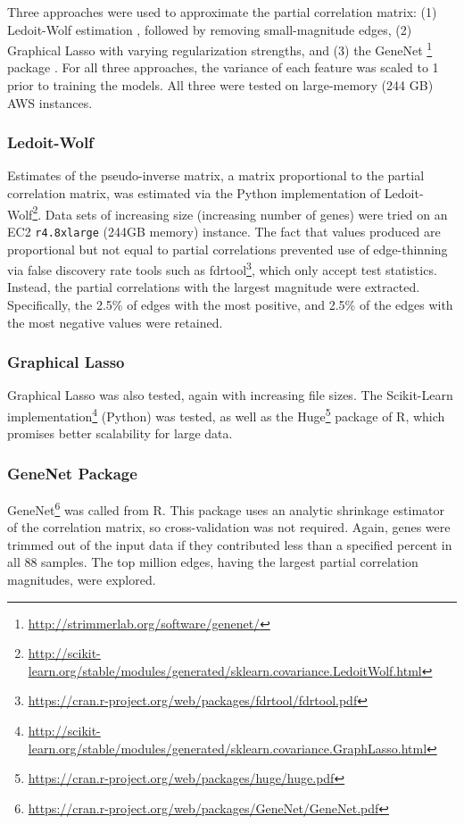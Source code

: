 Three approaches were used to approximate the partial correlation matrix: (1) Ledoit-Wolf estimation \cite{ledoit2003}, followed by removing small-magnitude edges, (2) Graphical Lasso \cite{friedman2008} with varying regularization strengths, and (3) the GeneNet \footnote{\url{http://strimmerlab.org/software/genenet/}} package \cite{schafer2001, schafer2005}.
For all three approaches, the variance of each feature was scaled to 1 prior to training the models.
All three were tested on large-memory (244 GB) AWS instances.

\subsubsection{Ledoit-Wolf}
Estimates of the pseudo-inverse matrix, a matrix proportional to the partial correlation matrix, was estimated via the Python implementation of Ledoit-Wolf\footnote{\url{http://scikit-learn.org/stable/modules/generated/sklearn.covariance.LedoitWolf.html}}.
Data sets of increasing size (increasing number of genes) were tried on an EC2 \texttt{r4.8xlarge} (244GB memory) instance.
The fact that values produced are proportional but not equal to partial correlations prevented use of edge-thinning via false discovery rate tools such as fdrtool\footnote{\url{https://cran.r-project.org/web/packages/fdrtool/fdrtool.pdf}}, which only accept test statistics.
Instead, the partial correlations with the largest magnitude were extracted.
Specifically, the 2.5\% of edges with the most positive, and 2.5\% of the edges with the most negative values were retained.

\subsubsection{Graphical Lasso}
Graphical Lasso was also tested, again with increasing file sizes.
The Scikit-Learn implementation\footnote{\url{http://scikit-learn.org/stable/modules/generated/sklearn.covariance.GraphLasso.html}} \cite{scikit-learn} (Python) was tested, as well as the Huge\footnote{\url{https://cran.r-project.org/web/packages/huge/huge.pdf}} \cite{zhao2012}  package of R, which promises better scalability for large data.

\subsubsection{GeneNet Package}
GeneNet\footnote{\url{https://cran.r-project.org/web/packages/GeneNet/GeneNet.pdf}} was called from R.
This package uses an analytic shrinkage estimator of the correlation matrix, so cross-validation was not required.
Again, genes were trimmed out of the input data if they contributed less than a specified percent in all 88 samples.
The top million edges, having the largest partial correlation magnitudes, were explored.

